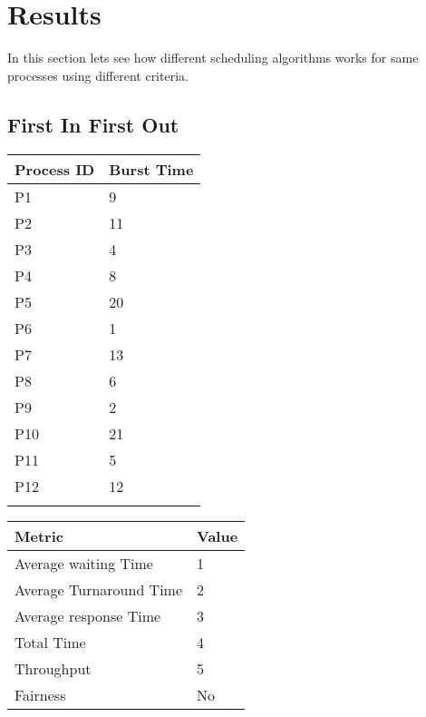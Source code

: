 \documentclass{article}
\begin{document}
\section{Results}
In this section lets see how different scheduling algorithms works for same processes using different criteria.
\vspace{\baselineskip}
\subsection{First In First Out}

\vspace{\baselineskip}
\hspace{1cm}

\begin{minipage}[t]{0.3\textwidth}
    \begin{tabularx}{\textwidth}{|l|X|}
    \hline
    \rowcolor{darkblue}
    \textbf{Process ID} & \textbf{Burst Time}\\
    \hline
    \rowcolor{lightblue}
    P1 & 9 \\
    P2 & 11 \\
    \rowcolor{lightblue}
    P3 & 4 \\
    P4 & 8 \\
    \rowcolor{lightblue}
    P5 & 20 \\
    P6 & 1 \\
    \rowcolor{lightblue}
    P7 & 13 \\
    P8 & 6 \\
    \rowcolor{lightblue}
    P9 & 2 \\
    P10 & 21 \\
    \rowcolor{lightblue}
    P11 & 5 \\
    P12 & 12 \\
    \rowcolor{lightblue}
    \hline
    \end{tabularx}
\end{minipage}
\hspace{2cm}
\begin{minipage}[t!]{0.35\textwidth}
    \begin{tabularx}{\textwidth}{|l|X|}
    \hline
    \rowcolor{darkblue}
    \textbf{Metric} & \textbf{Value} \\
    \hline
    \rowcolor{lightblue}
    Average waiting Time & 1 \\
    Average Turnaround Time & 2 \\
    \rowcolor{lightblue}
    Average response Time & 3 \\
    Total Time & 4 \\
    \rowcolor{lightblue}
    Throughput & 5 \\
    Fairness & No \\
    \hline
    \end{tabularx}
\end{minipage}
\end{document}
